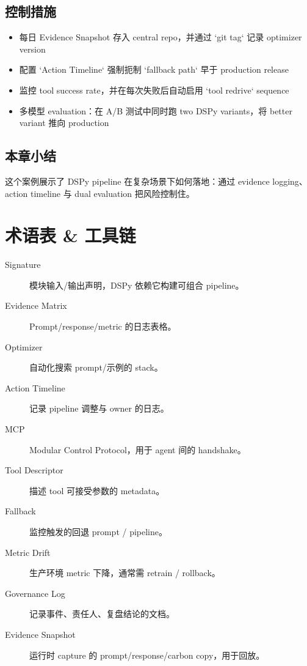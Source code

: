 \documentclass[a4paper]{article}
\begin{document}
\subsection{控制措施}

\begin{itemize}
    \item 每日 Evidence Snapshot 存入 central repo，并通过 `git tag` 记录 optimizer version
    \item 配置 `Action Timeline` 强制扼制 `fallback path` 早于 production release
    \item 监控 tool success rate，并在每次失败后自动启用 `tool redrive` sequence
    \item 多模型 evaluation：在 A/B 测试中同时跑 two DSPy variants，将 better variant 推向 production
\end{itemize}

\subsection{本章小结}

这个案例展示了 DSPy pipeline 在复杂场景下如何落地：通过 evidence logging、action timeline 与 dual evaluation 把风险控制住。

\section{术语表 \& 工具链}

\begin{description}
    \item[Signature] 模块输入/输出声明，DSPy 依赖它构建可组合 pipeline。
    \item[Evidence Matrix] Prompt/response/metric 的日志表格。
    \item[Optimizer] 自动化搜索 prompt/示例的 stack。
    \item[Action Timeline] 记录 pipeline 调整与 owner 的日志。
    \item[MCP] Modular Control Protocol，用于 agent 间的 handshake。
    \item[Tool Descriptor] 描述 tool 可接受参数的 metadata。
    \item[Fallback] 监控触发的回退 prompt / pipeline。
    \item[Metric Drift] 生产环境 metric 下降，通常需 retrain / rollback。
    \item[Governance Log] 记录事件、责任人、复盘结论的文档。
    \item[Evidence Snapshot] 运行时 capture 的 prompt/response/carbon copy，用于回放。
\end{description}
\end{document}
